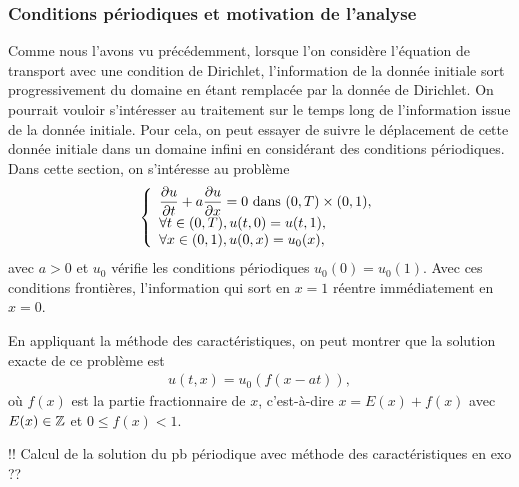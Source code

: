 \documentclass[12pt,a4paper,twoside]{article}
\begin{document}
\subsubsection{Conditions p\'eriodiques et motivation de l'analyse}

Comme nous l'avons vu pr\'ec\'edemment, lorsque l'on consid\`ere
l'\'equation de transport avec une condition de Dirichlet,
l'information de la donn\'ee initiale sort progressivement du domaine
en \'etant remplac\'ee par la donn\'ee de Dirichlet.
On pourrait vouloir s'int\'eresser au traitement sur le temps long de 
l'information issue de la donn\'ee initiale.
Pour cela, on peut essayer de suivre le d\'eplacement de cette donn\'ee
initiale dans un domaine infini en consid\'erant des conditions p\'eriodiques.
Dans cette section, on s'int\'eresse au probl\`eme
\begin{equation}
  \label{eq:transport_per}
  \left\{
    \begin{array}{l}
     \dfrac{\partial u}{\partial t} + a \dfrac{\partial u}{\partial x} = 0 
      \text{ dans } (0,T) \times (0,1),
      \\
      \forall t \in (0,T), u(t,0) = u(t,1) ,
      \\
      \forall x \in (0,1), u(0,x) = u_0(x) ,
    \end{array}
  \right.
\end{equation}
avec $a>0$ et $u_0$ v\'erifie les conditions p\'eriodiques $u_0(0) = u_0(1)$.
Avec ces conditions fronti\`eres, l'information qui sort en 
$x=1$ r\'eentre imm\'ediatement en $x=0$.


En appliquant la m\'ethode des caract\'eristiques, on peut montrer
que la solution exacte de ce probl\`eme est
\begin{align}
  \label{eq:sol_transport_per}
  u(t,x) = u_0(f(x-at)) ,
\end{align}
o\`u $f(x)$ est la partie fractionnaire de $x$,
c'est-\`a-dire $x = E(x) + f(x)$ avec $E(x) \in \mathbb{Z}$
et $0 \leq f(x) < 1$.


!! Calcul de la solution du pb p\'eriodique avec m\'ethode des caract\'eristiques en exo ??
\end{document}
